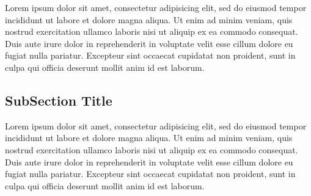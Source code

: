 Lorem ipsum dolor sit amet, consectetur adipisicing elit, sed do eiusmod tempor incididunt ut labore et dolore magna aliqua. Ut enim ad minim veniam, quis nostrud exercitation ullamco laboris nisi ut aliquip ex ea commodo consequat. Duis aute irure dolor in reprehenderit in voluptate velit esse cillum dolore eu fugiat nulla pariatur. Excepteur sint occaecat cupidatat non proident, sunt in culpa qui officia deserunt mollit anim id est laborum.

\subsection{SubSection Title}
Lorem ipsum dolor sit amet, consectetur adipisicing elit, sed do eiusmod tempor incididunt ut labore et dolore magna aliqua. Ut enim ad minim veniam, quis nostrud exercitation ullamco laboris nisi ut aliquip ex ea commodo consequat. Duis aute irure dolor in reprehenderit in voluptate velit esse cillum dolore eu fugiat nulla pariatur. Excepteur sint occaecat cupidatat non proident, sunt in culpa qui officia deserunt mollit anim id est laborum.